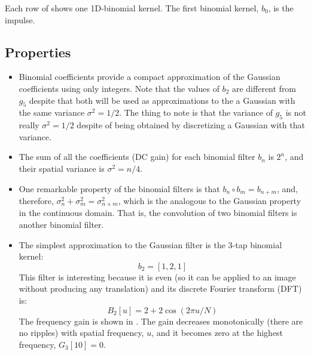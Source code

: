 Each row of \fig{\ref{fig:pascaltriangle}} shows one 1D-binomial kernel. The first binomial kernel, $b_0$, is the impulse.

\subsection{Properties}

\begin{itemize}
\item Binomial coefficients provide a compact approximation of the Gaussian coefficients using only integers. Note that the values of $b_2$ are different from $g_5$ despite that both will be used as approximations to the a Gaussian with the same variance $\sigma^2 = 1/2$. The thing to note is that the variance of   $g_5$ is not really  $\sigma^2 = 1/2$ despite of being obtained by discretizing a Gaussian with that variance.


\item The sum of all the coefficients (DC gain) for each binomial filter $b_n$ is $2^n$, and their spatial variance is $\sigma^2 = n/4$. 

\item One remarkable property of the binomial filters is that $b_n \circ b_m = b_{n+m}$, and, therefore, $\sigma_n^2 + \sigma_m^2  = \sigma_{n+m}^2$, which is the analogous to the Gaussian property in the continuous domain. That is, the convolution of two binomial filters is another binomial filter. 


\item The simplest approximation to the Gaussian filter is the 3-tap binomial kernel:
\begin{equation}
b_2 = \left[1, 2, 1\right] 
\end{equation}
This filter is interesting because it is even (so it can be applied to an image without producing any translation) and its discrete Fourier transform (DFT) is:
\begin{equation}
B_2 \left[u\right] = 2+2 \cos (2 \pi u/N)
\end{equation}
The frequency gain is shown in . The gain decreases monotonically (there are no ripples) with spatial frequency, $u$, and it becomes zero at the highest frequency, $G_3 \left[ 10 \right]=0$.




\end{itemize}
